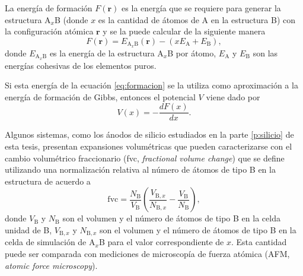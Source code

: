 La energía de formación $F(\mathbf{r})$ es la energía que se requiere para 
generar la estructura A$_x$B (donde $x$ es la cantidad de átomos de A en la 
estructura B) con la configuración atómica $\mathbf{r}$ y se la puede calcular de
la siguiente manera
\begin{equation}\label{eq:formacion}
    F(\mathbf{r}) = E_{\text{A}_x\text{B}}(\mathbf{r}) - (x E_{\text{A}} + E_{\text{B}}),
\end{equation}
donde $E_{\text{A}_x\text{B}}$ es la energía de la estructura A$_x$B por átomo, 
$E_{\text{A}}$ y $E_{\text{B}}$ son las energías cohesivas de los elementos puros.

Si esta energía de la ecuación \ref{eq:formacion} se la utiliza como aproximación 
a la energía de formación de Gibbs, entonces el potencial $V$ viene dado por
\begin{equation}\label{eq:potencial}
    V(x) = - \frac{d F(x)}{dx}.
\end{equation}

Algunos sistemas, como los ánodos de silicio estudiados en la parte 
\ref{p:silicio} de esta tesis, presentan expansiones volumétricas que pueden 
caracterizarse con el cambio volumétrico fraccionario (fvc, \textit{fractional 
volume change}) que se define utilizando una normalización relativa al número de
átomos de tipo B en la estructura de acuerdo a 
\begin{equation}\label{eq:fvc}
    \text{fvc} = \frac{N_{\text{B}}}{V_{\text{B}}} \left( \frac{V_{\text{B},x}}{N_{\text{B},x}} - \frac{V_{\text{B}}}{N_{\text{B}}} \right),
\end{equation}
donde $V_{\text{B}}$ y $N_{\text{B}}$ son el volumen y el número de átomos de 
tipo B en la celda unidad de B, $V_{\text{B},x}$ y $N_{\text{B},x}$ son el 
volumen y el número de átomos de tipo B en la celda de simulación de A$_x$B para
el valor correspondiente de $x$. Esta cantidad puede ser comparada con mediciones
de microscopía de fuerza atómica (AFM, \textit{atomic force microscopy}).
